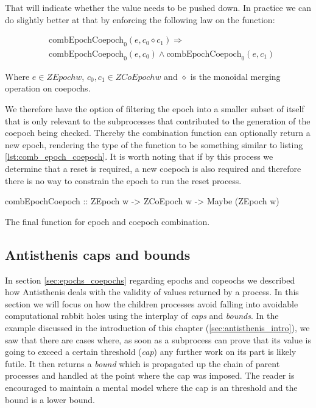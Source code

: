 That will indicate whether the value needs to be pushed down. In
practice we can do slightly better at that by enforcing the following
law on the  function:

\begin{align*}
& \text{combEpochCoepoch}_0(e, c_0 \diamond c_1) \Rightarrow \\
& \text{combEpochCoepoch}_0(e,c_0) \land \text{combEpochCoepoch}_0(e,c_1)
\end{align*}

Where \(e \in \mathit{ZEpoch w}\), \(c_0,c_1 \in \mathit{ZCoEpoch w}\)
and \(\diamond\) is the monoidal merging operation on coepochs.

We therefore have the option of filtering the epoch into a smaller
subset of itself that is only relevant to the subprocesses that
contributed to the generation of the coepoch being checked. Thereby
the combination function can optionally return a new epoch, rendering
the type of the function to be something similar to listing
\ref{lst:comb_epoch_coepoch}. It is worth noting that if by this
process we determine that a reset is required, a new coepoch is also
required and therefore there is no way to constrain the epoch to run
the reset process.

\begin{code}
\begin{haskellcode}
combEpochCoepoch :: ZEpoch w -> ZCoEpoch w -> Maybe (ZEpoch w)
\end{haskellcode}
  \caption{\label{lst:comb_epoch_coepoch}The final function for epoch
    and coepoch combination.}
\end{code}

\subsection{Antisthenis caps and bounds}
\label{sec:caps_and_bounds}

In section \ref{sec:epochs_coepochs} regarding epochs and copeochs we
described how Antisthenis deals with the validity of values returned
by a process.  In this section we will focus on how the children
processes avoid falling into avoidable computational rabbit holes
using the interplay of \emph{caps} and \emph{bounds}.  In the example
discussed in the introduction of this chapter
(\ref{sec:antisthenis_intro}), we saw that there are cases where, as
soon as a subprocess can prove that its value is going to exceed a
certain threshold (\emph{cap}) any further work on its part is likely
futile. It then returns a \emph{bound} which is propagated up the
chain of parent processes and handled at the point where the cap was
imposed.  The reader is encouraged to maintain a mental model where
the cap is an threshold and the bound is a lower bound.

